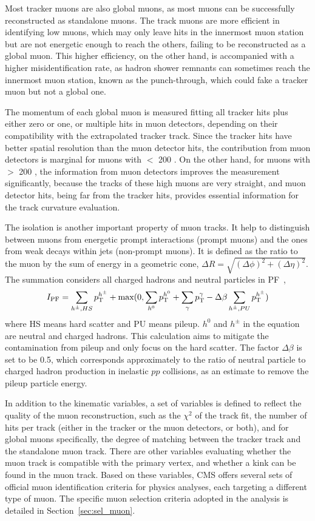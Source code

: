 Most tracker muons are also global muons, as most muons can be successfully reconstructed as standalone muons.
The track muons are more efficient in identifying low \pt muons, 
which may only leave hits in the innermost muon station but are not energetic enough to reach the others,
failing to be reconstructed as a global muon.
This higher efficiency, on the other hand, is accompanied with a higher misidentification rate,
as hadron shower remnants can sometimes reach the innermost muon station, known as the punch-through,
which could fake a tracker muon but not a global one. 

The momentum of each global muon is measured fitting all tracker hits plus either zero or one, or multiple hits in muon detectors,
depending on their compatibility with the extrapolated tracker track.
Since the tracker hits have better spatial resolution than the muon detector hits, 
the contribution from muon detectors is marginal for muons with \pt $<$ 200 \GeV.
On the other hand, for muons with \pt $>$ 200 \GeV, the information from muon detectors improves the measurement significantly,
because the tracks of these high \pt muons are very straight, and muon detector hits, being far from the tracker hits,
provides essential information for the track curvature evaluation.

The isolation is another important property of muon tracks.
It help to distinguish between muons from energetic prompt interactions (prompt muons) and the ones from weak decays within jets (non-prompt muons). 
It is defined as the ratio to the muon \pt by the sum of energy in a geometric cone, 
$\Delta{}R = \sqrt{(\Delta{}\phi)^{2} + (\Delta{}\eta)^{2}}$.
The summation considers all charged hadrons and neutral particles in PF~\cite{Sirunyan_2017},
\begin{equation}\label{eq:iso_def}
    I_{\text{PF}} = \sum_{h^{\pm}, HS} p_{\mathrm{T}}^{h^{\pm}} + \text{max}(0, \sum_{h^{0}} p_{\mathrm{T}}^{h^{0}} + \sum_{\gamma} p_{\mathrm{T}}^{\gamma} - \Delta\beta \sum_{h^{\pm}, PU} p_{\mathrm{T}}^{h^{\pm}})
\end{equation}
where HS means hard scatter and PU means pileup.
$h^{0}$ and $h^{\pm}$ in the equation are neutral and charged hadrons.
This calculation aims to mitigate the contamination from pileup and only focus on the hard scatter.
The factor $\Delta\beta$ is set to be 0.5, which corresponds approximately to the ratio of neutral particle to charged hadron production 
in inelastic $pp$ collisions, as an estimate to remove the pileup particle energy. 

In addition to the kinematic variables, a set of variables is defined to reflect the quality of the muon reconstruction,
such as the $\chi^{2}$ of the track fit, the number of hits per track (either in the tracker or the muon detectors, or both), 
and for global muons specifically, the degree of matching between the tracker track and the standalone muon track.
There are other variables evaluating whether the muon track is compatible with the primary vertex, 
and whether a kink can be found in the muon track.
Based on these variables, CMS offers several sets of official muon identification criteria for physics analyses,
each targeting a different type of muon.
The specific muon selection criteria adopted in the \hmm analysis is detailed in Section~\ref{sec:sel_muon}.


